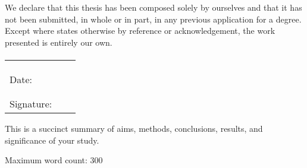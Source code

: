 
\cleardoublepage  %


We declare that this thesis has been composed solely by ourselves and that it has not been submitted, in whole or in part, in any previous application for a degree. 
Except where states otherwise by reference or acknowledgement, the work presented is entirely our
own.

\paragraph{}
\begin{tabular}{lcc}

	& \AuthorA & \AuthorB \\
	& \AuthorAID & \AuthorBID \\
	
	& & \\ %
	
	Date: &  \dotfill & \dotfill \\ 
	
	& & \\ %
	& & \\ %
	
	Signature: & \dotfill & \dotfill \\ 
	
\end{tabular}

\cleardoublepage %

This is a succinct summary of aims, methods, conclusions, results, and significance of your study. 

Maximum word count: 300

\cleardoublepage %


\cleardoublepage %

